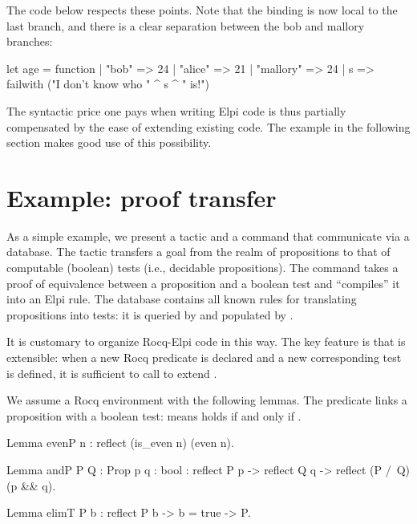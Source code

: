 \documentclass[a4paper, 11pt]{book}
\begin{document}
The code below respects these points. Note that the  binding is now
local to the last branch, and there is a clear separation between the bob and
mallory branches:

\begin{ocamlcode}
let age = function
  | "bob" => 24
  | "alice" => 21
  | "mallory" => 24
  | s => failwith ("I don't know who " ^ s ^ " is!")
\end{ocamlcode}
  

The syntactic price one pays when writing Elpi code is thus partially
compensated by the ease of extending existing code. The example in the
following section makes good use of this possibility.

\section{Example: proof transfer}\label{sec:tb}


As a simple example, we present a tactic and a command that communicate via a
database. The tactic  transfers a goal from the realm of
propositions to that of computable (boolean) tests (i.e., decidable
propositions). The command  takes a proof of
equivalence between a proposition and a boolean test and ``compiles'' it into an
Elpi rule. The database contains all known rules for translating propositions
into tests: it is queried by  and populated by
.


It is customary to organize Rocq-Elpi code in this way. The key feature is that
 is extensible: when a new Rocq predicate is declared and a new
corresponding test is defined, it is sufficient to call
 to extend .



We assume a Rocq environment with the following lemmas. The 
predicate links a proposition with a boolean test:  means
 holds if and only if .

\begin{rocqcode}
Lemma evenP n : reflect (is_even n) (even n).

Lemma andP  {P Q : Prop} {p q : bool} :
  reflect P p -> reflect Q q -> reflect (P /\ Q) (p && q).

Lemma elimT {P b} :
  reflect P b -> b = true -> P.
\end{rocqcode}
\end{document}
